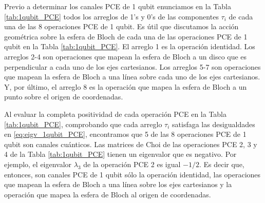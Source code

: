 Previo a determinar los canales PCE de 1 qubit enunciamos en la Tabla
\ref{tab:1qubit_PCE} todos los arreglos de 1's y 0's de las 
componentes $\tau_i$ de cada una de las 8 operaciones PCE de 1 qubit. 
Es útil que discutamos la acción geométrica sobre la esfera de Bloch de 
cada una de las operaciones PCE de 1 qubit en la Tabla \ref{tab:1qubit_PCE}.
El arreglo 1 es la operación identidad. Los arreglos 2-4 son operaciones
que mapean la esfera de Bloch a un disco que es perpendicular 
a cada uno de los ejes cartesianos. Los arreglos 
5-7 son operaciones que mapean la esfera de Bloch a una línea sobre cada
uno de los ejes cartesianos. Y, por último, el arreglo 8 es la operación 
que mapea la esfera de Bloch a un punto sobre el origen de coordenadas. 

Al evaluar la completa positividad de cada operación PCE en la Tabla
\ref{tab:1qubit_PCE}, comprobando que cada arreglo $\tau_i$ 
satisfaga las desigualdades en \eqref{eq:eigv_1qubit_PCE},
encontramos que 5 de las 8 operaciones PCE de 1 qubit
son canales cuánticos. Las matrices de Choi de las operaciones PCE 
2, 3 y 4 de la Tabla \ref{tab:1qubit_PCE} tienen un eigenvalor que es negativo. 
Por ejemplo, el eigenvalor $\lambda_3$ de la operación PCE 2 
es igual $-1/2$. Es decir que, entonces, son canales PCE de 1 qubit 
sólo la operación identidad, las operaciones que 
mapean la esfera de Bloch a una línea sobre los ejes cartesianos y la 
operación que mapea la esfera de Bloch al origen de coordenadas.

%
%
%

